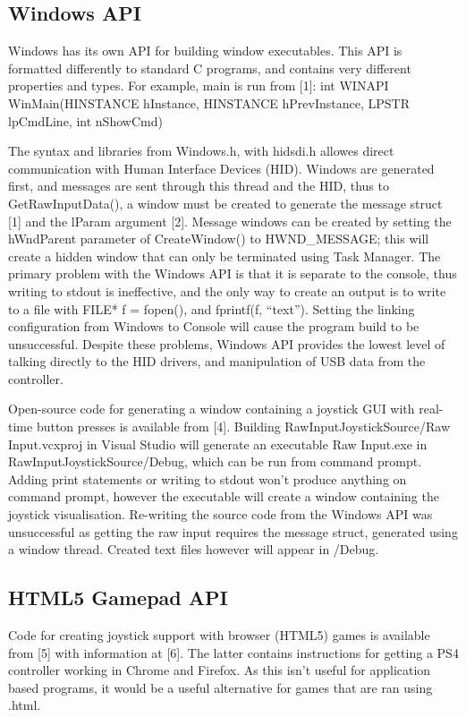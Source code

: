 \documentclass[12pt,openany,a4paper]{book}
\begin{document}
\subsection{Windows API}
Windows has its own API for building window executables. This API is formatted differently to standard C programs, and contains very different properties and types. For example, main is run from [1]:
int WINAPI WinMain(HINSTANCE hInstance, HINSTANCE hPrevInstance, LPSTR lpCmdLine, int nShowCmd){
The syntax and libraries from Windows.h, with hidsdi.h allowes direct communication with Human Interface Devices (HID). Windows are generated first, and messages are sent through this thread and the HID, thus to GetRawInputData(), a window must be created to generate the message struct [1] and the lParam argument [2]. Message windows can be created by setting the hWndParent parameter of CreateWindow() to HWND\_MESSAGE; this will create a hidden window that can only be terminated using Task Manager. 
The primary problem with the Windows API is that it is separate to the console, thus writing to stdout is ineffective, and the only way to create an output is to write to a file with FILE* f = fopen(), and fprintf(f, “text”). Setting the linking configuration from Windows to Console will cause the program build to be unsuccessful. Despite these problems, Windows API provides the lowest level of talking directly to the HID drivers, and manipulation of USB data from the controller.

Open-source code for generating a window containing a joystick GUI with real-time button presses is available from [4]. Building RawInputJoystickSource/Raw Input.vcxproj in Visual Studio will generate an executable Raw Input.exe in RawInputJoystickSource/Debug, which can be run from command prompt. Adding print statements or writing to stdout won't produce anything on command prompt, however the executable will create a window containing the joystick visualisation. Re-writing the source code from the Windows API was unsuccessful as getting the raw input requires the message struct, generated using a window thread. Created text files however will appear in /Debug.

\subsection{HTML5 Gamepad API}
Code for creating joystick support with browser (HTML5) games is available from [5] with information at [6]. The latter contains instructions for getting a PS4 controller working in Chrome and Firefox. As this isn’t useful for application based programs, it would be a useful alternative for games that are ran using .html.

}
\end{document}
